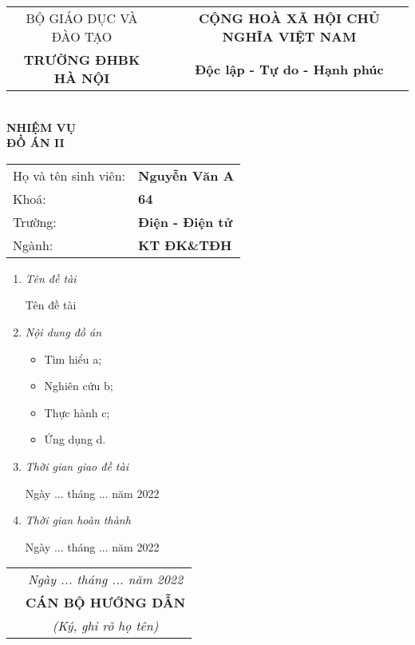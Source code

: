 \thispagestyle{empty}
\setlength{\parindent}{0cm}
\begin{center}
\fontsize{11}{0} \selectfont
\begin{tabular}{c p{0.15cm} c}
BỘ GIÁO DỤC VÀ ĐÀO TẠO & & \textbf{CỘNG HOÀ XÃ HỘI CHỦ NGHĨA VIỆT NAM}
\\
\textbf{TRƯỜNG ĐHBK HÀ NỘI} & & \textbf{Độc lập - Tự do - Hạnh phúc}
\end{tabular}
\\[1cm]
\fontsize{14}{0}\textbf{NHIỆM VỤ\\ĐỒ ÁN II}
\\[1cm]
\end{center}

\fontsize{12}{15} \selectfont
\begin{tabular}{l l}
Họ và tên sinh viên: & \textbf{Nguyễn Văn A}
\\
Khoá: & \textbf{64}
\\
Trường: & \textbf{Điện - Điện tử}
\\
Ngành: & \textbf{KT ĐK\&TĐH}
\end{tabular}

\begin{enumerate}[\itshape 1.]

\item \textit{Tên đề tài}

Tên đề tài

\item \textit{Nội dung đồ án}

\begin{itemize}
\renewcommand\labelitemi{--}
    \item Tìm hiểu a;
    \item Nghiên cứu b;
    \item Thực hành c;
    \item Ứng dụng d.
\end{itemize}

\item \textit{Thời gian giao đề tài}

Ngày ... tháng ... năm 2022

\item \textit{Thời gian hoàn thành}

Ngày ... tháng ... năm 2022

\end{enumerate}

\begin{tabular}{p{10cm} c}
\\
& \textit{Ngày ... tháng ... năm 2022}
\\
& \textbf{CÁN BỘ HƯỚNG DẪN}
\\[-5pt]
& \textit{(Ký, ghi rõ họ tên)}
\\
\end{tabular}
\newpage